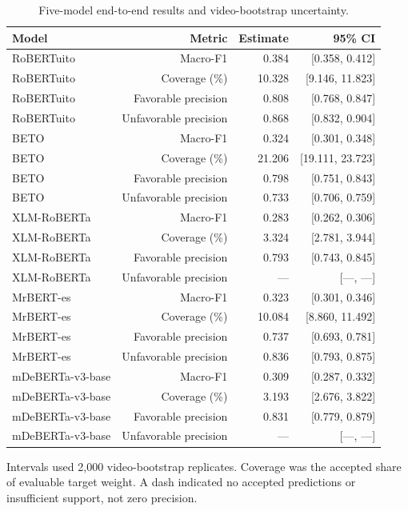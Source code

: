 \documentclass[11pt,a4paper]{article}
\begin{document}
\begin{table}[H]\centering\small
\caption{Five-model end-to-end results and video-bootstrap uncertainty.}
\label{tab:supp_five_models}
\setlength{\tabcolsep}{4pt}
\begin{tabular}{lrrr}\toprule
Model & Metric & Estimate & 95\% CI\\\midrule
RoBERTuito & Macro-F1 & 0.384 & [0.358, 0.412]\\
RoBERTuito & Coverage (\%) & 10.328 & [9.146, 11.823]\\
RoBERTuito & Favorable precision & 0.808 & [0.768, 0.847]\\
RoBERTuito & Unfavorable precision & 0.868 & [0.832, 0.904]\\
BETO & Macro-F1 & 0.324 & [0.301, 0.348]\\
BETO & Coverage (\%) & 21.206 & [19.111, 23.723]\\
BETO & Favorable precision & 0.798 & [0.751, 0.843]\\
BETO & Unfavorable precision & 0.733 & [0.706, 0.759]\\
XLM-RoBERTa & Macro-F1 & 0.283 & [0.262, 0.306]\\
XLM-RoBERTa & Coverage (\%) & 3.324 & [2.781, 3.944]\\
XLM-RoBERTa & Favorable precision & 0.793 & [0.743, 0.845]\\
XLM-RoBERTa & Unfavorable precision & --- & [---, ---]\\
MrBERT-es & Macro-F1 & 0.323 & [0.301, 0.346]\\
MrBERT-es & Coverage (\%) & 10.084 & [8.860, 11.492]\\
MrBERT-es & Favorable precision & 0.737 & [0.693, 0.781]\\
MrBERT-es & Unfavorable precision & 0.836 & [0.793, 0.875]\\
mDeBERTa-v3-base & Macro-F1 & 0.309 & [0.287, 0.332]\\
mDeBERTa-v3-base & Coverage (\%) & 3.193 & [2.676, 3.822]\\
mDeBERTa-v3-base & Favorable precision & 0.831 & [0.779, 0.879]\\
mDeBERTa-v3-base & Unfavorable precision & --- & [---, ---]\\
\bottomrule\end{tabular}
\par\smallskip\footnotesize Intervals used 2,000 video-bootstrap replicates. Coverage was the accepted share of evaluable target weight. A dash indicated no accepted predictions or insufficient support, not zero precision.
\end{table}
\end{document}
